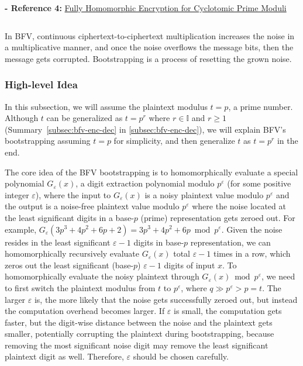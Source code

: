 \noindent \textbf{- Reference 4:} 
\href{https://eprint.iacr.org/2024/1587.pdf}{Fully Homomorphic Encryption for Cyclotomic Prime Moduli}~\cite{cryptoeprint:2024/1587}



$ $

In BFV, continuous ciphertext-to-ciphertext multiplication increases the noise in a multiplicative manner, and once the noise overflows the message bits, then the message gets corrupted. Bootstrapping is a process of resetting the grown noise. 

\subsubsection{High-level Idea}
\label{subsubsec:bfv-bootstrapping-high-level}

In this subsection, we will assume the plaintext modulus $t = p$, a prime number. Although $t$ can be generalized as $t = p^r$ where $r \in \mathbb{I}$ and $r \geq 1$ (Summary~\ref*{subsec:bfv-enc-dec} in \autoref{subsec:bfv-enc-dec}), we will explain BFV's bootstrapping assuming $t=p$ for simplicity, and then generalize $t$ as $t = p^r$ in the end. 

The core idea of the BFV bootstrapping is to homomorphically evaluate a special polynomial $G_\varepsilon(x)$, a digit extraction polynomial modulo $p^\varepsilon$ (for some positive integer $\varepsilon$), where the input to $G_\varepsilon(x)$ is a noisy plaintext value modulo $p^\varepsilon$ and the output is a noise-free plaintext value modulo $p^\varepsilon$ where the noise located at the least significant digits in a base-$p$ (prime) representation gets zeroed out. For example, $G_\varepsilon(3p^3 + 4p^2 + 6p + 2) = 3p^3 + 4p^2 + 6p \bmod p^\varepsilon$. Given the noise resides in the least significant $\varepsilon-1$ digits in base-$p$ representation, we can homomorphically recursively evaluate $G_\varepsilon(x)$ total $\varepsilon-1$ times in a row, which zeros out the least significant (base-$p$) $\varepsilon-1$ digits of input $x$. To homomorphically evaluate the noisy plaintext through $G_\varepsilon(x) \bmod p^\varepsilon$, we need to first switch the plaintext modulus from $t$ to $p^\varepsilon$, where $q \gg p^\varepsilon > p = t$. The larger $\varepsilon$ is, the more likely that the noise gets successfully zeroed out, but instead the computation overhead becomes larger. If $\varepsilon$ is small, the computation gets faster, but the digit-wise distance between the noise and the plaintext gets smaller, potentially corrupting the plaintext during bootstrapping, because removing the most significant noise digit may remove the least significant plaintext digit as well. Therefore, $\varepsilon$ should be chosen carefully. 

